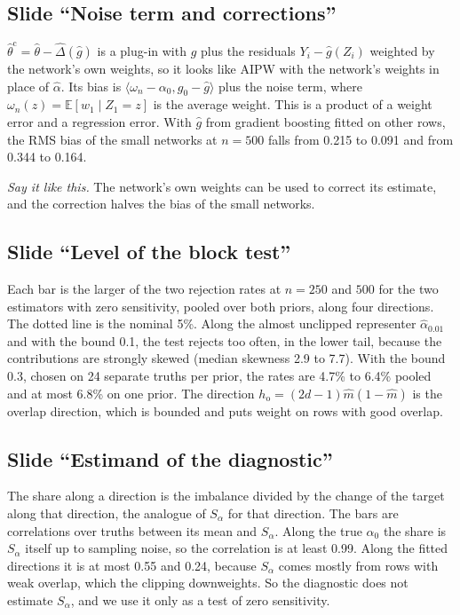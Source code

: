 \documentclass[10pt]{article}
\newcommand{\E}{\mathbb{E}}
\newcommand{\slide}[1]{\subsection*{Slide ``#1''}}
\newcommand{\say}[1]{\par\textit{Say it like this.} #1\par}
\begin{document}
\slide{Noise term and corrections}
$\hat\theta^{\mathrm c}=\hat\theta-\hat\Delta(\hat g)$ is a plug-in with $\hat g$ plus the residuals $Y_i-\hat g(Z_i)$
weighted by the network's own weights, so it looks like AIPW with the network's weights in place of $\hat\alpha$. Its
bias is $\langle\omega_n-\alpha_0,g_0-\hat g\rangle$ plus the noise term, where $\omega_n(z)=\E[w_1\mid Z_1=z]$ is the
average weight. This is a product of a weight error and a regression error. With $\hat g$ from gradient boosting fitted
on other rows, the RMS bias of the small networks at $n=500$ falls from 0.215 to 0.091 and from 0.344 to 0.164.
\say{The network's own weights can be used to correct its estimate, and the correction halves the bias of the small
networks.}

\slide{Level of the block test}
Each bar is the larger of the two rejection rates at $n=250$ and $500$ for the two estimators with zero sensitivity,
pooled over both priors, along four directions. The dotted line is the nominal 5\%. Along the almost unclipped
representer $\hat\alpha_{0.01}$ and with the bound 0.1, the test rejects too often, in the lower tail, because the
contributions are strongly skewed (median skewness 2.9 to 7.7). With the bound 0.3, chosen on 24 separate truths per
prior, the rates are 4.7\% to 6.4\% pooled and at most 6.8\% on one prior. The direction $h_{\mathrm o}=(2d-1)\hat
m(1-\hat m)$ is the overlap direction, which is bounded and puts weight on rows with good overlap.

\slide{Estimand of the diagnostic}
The share along a direction is the imbalance divided by the change of the target along that direction, the analogue of
$S_\alpha$ for that direction. The bars are correlations over truths between its mean and $S_\alpha$. Along the true
$\alpha_0$ the share is $S_\alpha$ itself up to sampling noise, so the correlation is at least 0.99. Along the fitted
directions it is at most 0.55 and 0.24, because $S_\alpha$ comes mostly from rows with weak overlap, which the clipping
downweights. So the diagnostic does not estimate $S_\alpha$, and we use it only as a test of zero sensitivity.
\end{document}
